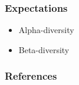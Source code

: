 \documentclass{beamer}
\begin{document}
    \begin{frame}
        \frametitle{Expectations}

        \begin{itemize}
            \item Alpha-diversity
            \item Beta-diversity
        \end{itemize}
    \end{frame}

   	\begin{frame}[allowframebreaks]
        \frametitle{References}
        
        
    \end{frame}
\end{document}
